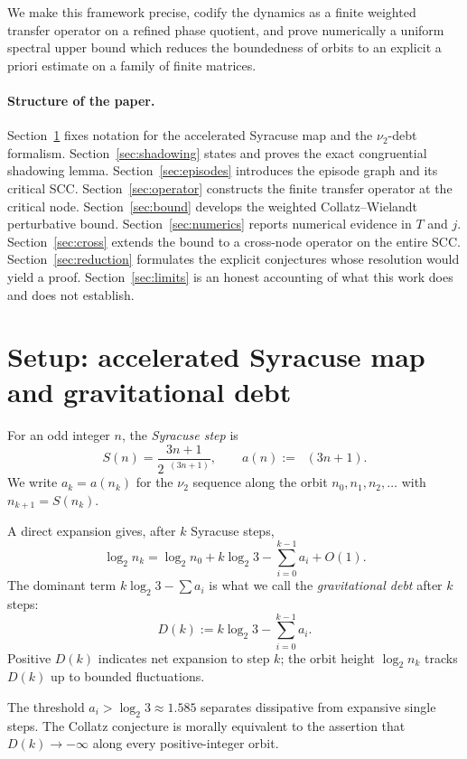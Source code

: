 \documentclass[11pt,a4paper]{article}
\theoremstyle{definition}
\DeclareMathOperator{\nutwo}{\nu_2}
\begin{document}
We make this framework precise, codify the dynamics as a finite
weighted transfer operator on a refined phase quotient, and prove
numerically a uniform spectral upper bound which reduces the
boundedness of orbits to an explicit a priori estimate on a family
of finite matrices.

\paragraph{Structure of the paper.}
Section~\ref{sec:setup} fixes notation for the accelerated Syracuse
map and the $\nu_2$-debt formalism. Section~\ref{sec:shadowing}
states and proves the exact congruential shadowing lemma.
Section~\ref{sec:episodes} introduces the episode graph and its
critical SCC. Section~\ref{sec:operator} constructs the finite
transfer operator at the critical node. Section~\ref{sec:bound}
develops the weighted Collatz--Wielandt perturbative bound.
Section~\ref{sec:numerics} reports numerical evidence in $T$ and $j$.
Section~\ref{sec:cross} extends the bound to a cross-node operator
on the entire SCC. Section~\ref{sec:reduction} formulates the
explicit conjectures whose resolution would yield a proof.
Section~\ref{sec:limits} is an honest accounting of what this work
does and does not establish.

\section{Setup: accelerated Syracuse map and gravitational debt}
\label{sec:setup}

For an odd integer $n$, the \emph{Syracuse step} is
\[
S(n) = \frac{3n+1}{2^{\nutwo(3n+1)}},
\qquad
a(n) := \nutwo(3n+1).
\]
We write $a_k = a(n_k)$ for the $\nu_2$ sequence along the orbit
$n_0, n_1, n_2, \ldots$ with $n_{k+1} = S(n_k)$.

A direct expansion gives, after $k$ Syracuse steps,
\[
\log_2 n_k = \log_2 n_0 + k \log_2 3 - \sum_{i=0}^{k-1} a_i + O(1).
\]
The dominant term $k \log_2 3 - \sum a_i$ is what we call the
\emph{gravitational debt} after $k$ steps:
\[
D(k) := k \log_2 3 - \sum_{i=0}^{k-1} a_i.
\]
Positive $D(k)$ indicates net expansion to step $k$; the orbit
height $\log_2 n_k$ tracks $D(k)$ up to bounded fluctuations.

The threshold $a_i > \log_2 3 \approx 1.585$ separates dissipative
from expansive single steps. The Collatz conjecture is morally
equivalent to the assertion that $D(k) \to -\infty$ along every
positive-integer orbit.
\end{document}
